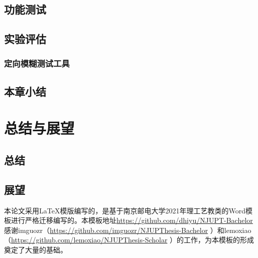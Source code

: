 \documentclass[bachelor]{njupthesis}
\begin{document}
\section{功能测试}
\section{实验评估}
\subsection{定向模糊测试工具}
\section{本章小结}


\chapter{总结与展望}
\section{总结}
\section{展望}



			
			

\thesisconclusion

\thesisacknowledgement

本论文采用\LaTeX 模版编写的，是基于南京邮电大学2021年理工艺教类的Word模板进行严格迁移编写的。本模板地址\url{https://github.com/dhiyu/NJUPT-Bachelor}感谢imguozr（\url{https://github.com/imguozr/NJUPThesis-Bachelor} ）和lemoxiao（\url{https://github.com/lemoxiao/NJUPThesis-Scholar} ）的工作，为本模板的形成奠定了大量的基础。

\thesisreference
\end{document}
